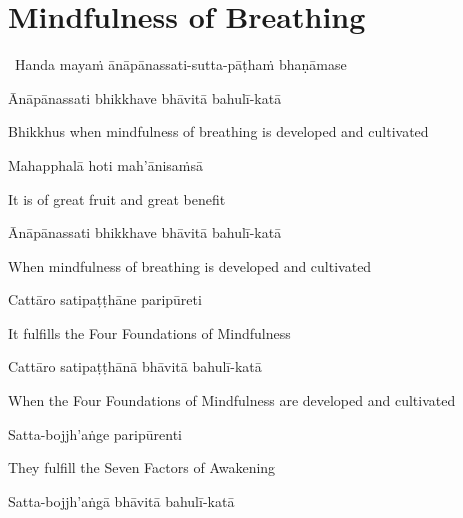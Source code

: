 \suttaRef{[SN 45.8]}

\enlargethispage{\baselineskip\vspace{-0.5em}}

\section{Mindfulness of Breathing}
\label{mindfulness-of-breathing}

\begin{leader}
  \anglebracketleft\ \hspace{-0.5mm}Handa mayaṁ ānāpānassati-sutta-pāṭhaṁ bhaṇāmase \hspace{-0.5mm}\anglebracketright\
\end{leader}

Ānāpānassati bhikkhave bhāvitā bahulī-katā

\begin{english}
  Bhikkhus when mindfulness of breathing is developed and cultivated
\end{english}

Mahapphalā hoti mah'ānisaṁsā

\begin{english}
  It is of great fruit and great benefit
\end{english}

Ānāpānassati bhikkhave bhāvitā bahulī-katā

\begin{english}
  When mindfulness of breathing is developed and cultivated
\end{english}

Cattāro satipaṭṭhāne paripūreti

\begin{english}
  It fulfills the Four Foundations of Mindfulness
\end{english}

Cattāro satipaṭṭhānā bhāvitā bahulī-katā

\begin{english-hang}
  When the Four Foundations of Mindfulness are developed and cultivated
\end{english-hang}

Satta-bojjh'aṅge paripūrenti

\begin{english}
  They fulfill the Seven Factors of Awakening
\end{english}

Satta-bojjh'aṅgā bhāvitā bahulī-katā

